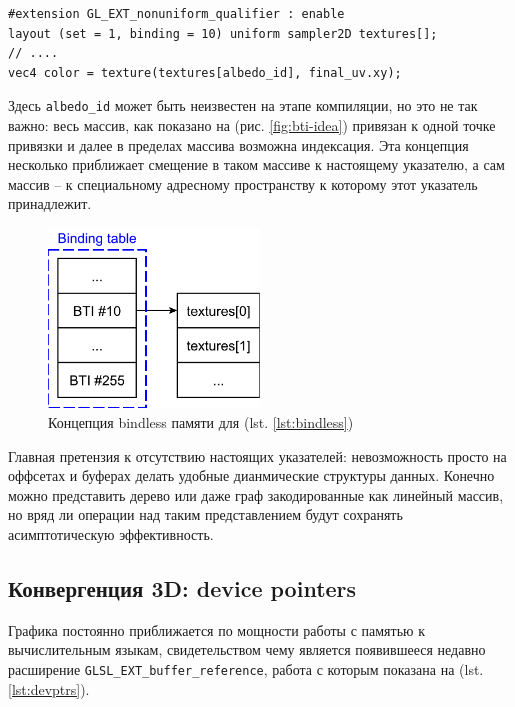 \documentclass[a4paper,12pt,oneside]{article}
\begin{document}
\begin{lstlisting}[caption={Работа с bindless памятью на GLSL},label={lst:bindless}]
#extension GL_EXT_nonuniform_qualifier : enable
layout (set = 1, binding = 10) uniform sampler2D textures[];
// ....
vec4 color = texture(textures[albedo_id], final_uv.xy);
\end{lstlisting}

Здесь \lstinline!albedo_id! может быть неизвестен на этапе компиляции, но это не так важно: весь массив, как показано на (рис. \ref{fig:bti-idea}) привязан к одной точке привязки и далее в пределах массива возможна индексация.
Эта концепция несколько приближает смещение в таком массиве к настоящему указателю, а сам массив -- к специальному адресному пространству к которому этот указатель принадлежит.

\begin{figure}
\centering
\includegraphics[width=0.5\textwidth]{pictures/bindless-idea.pdf}
\caption{Концепция bindless памяти для (lst. \ref{lst:bindless})}
\label{fig:bindless-idea}
\end{figure}

Главная претензия к отсутствию настоящих указателей: невозможность просто на оффсетах и буферах делать удобные дианмические структуры данных.
Конечно можно представить дерево или даже граф закодированные как линейный массив, но вряд ли операции над таким представлением будут сохранять асимптотическую эффективность.

\subsection{Конвергенция 3D: device pointers}\label{subsec:devpointers}

Графика постоянно приближается по мощности работы с памятью к вычислительным языкам, свидетельством чему является появившееся недавно расширение \lstinline!GLSL_EXT_buffer_reference!, работа с которым показана на (lst. \ref{lst:devptrs}).
\end{document}
